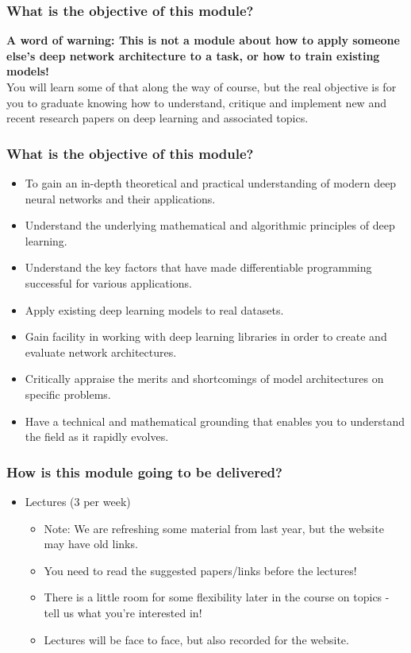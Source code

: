 \documentclass[\beamerclass]{beamer}
\begin{document}
\begin{frame}
	\frametitle{What is the objective of this module?}
	
	\textbf{A word of warning: This is not a module about how to apply someone else's deep network architecture to a task, or how to train existing models!}
	\\[1em]
	You will learn some of that along the way of course, but the real objective is for you to graduate knowing how to understand, critique and implement new and recent research papers on deep learning and associated topics.
\end{frame}

\begin{frame}
	\frametitle{What is the objective of this module?}
	\begin{itemize}
		\item<+-> To gain an in-depth theoretical and practical understanding of modern deep neural networks and their applications.
		\item<+-> Understand the underlying mathematical and algorithmic principles of deep learning.
		\item<+-> Understand the key factors that have made differentiable programming successful for various applications.
		\item<+-> Apply existing deep learning models to real datasets.
		\item<+-> Gain facility in working with deep learning libraries in order to create and evaluate network architectures.
		\item<+-> Critically appraise the merits and shortcomings of model architectures on specific problems.
		\item<+-> Have a technical and mathematical grounding that enables you to understand the field as it rapidly evolves.
	\end{itemize}
\end{frame}

\begin{frame}
	\frametitle{How is this module going to be delivered?}
	
	\begin{itemize}
		\item<+-> Lectures (3 per week)
		\begin{itemize}
			\item Note: We are refreshing some material from last year, but the website may have old links.
			\item You need to read the suggested papers/links before the lectures!
			\item There is a little room for some flexibility later in the course on topics - tell us what you're interested in!
			\item<+-> Lectures will be face to face, but also recorded for the website. 
			
		\end{itemize}
	\end{itemize}
\end{frame}
\end{document}
